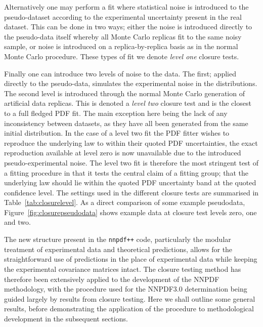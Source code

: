 Alternatively one may perform a fit where statistical noise is introduced to the pseudo-dataset according to the experimental uncertainty present in the real dataset. This can be done in two ways; either the noise is introduced directly to the pseudo-data itself whereby all Monte Carlo replicas fit to the same noisy sample, or noise is introduced on a replica-by-replica basis as in the normal Monte Carlo procedure. These types of fit we denote \emph{level one} closure tests.

Finally one can introduce two levels of noise to the data. The first; applied directly to the pseudo-data, simulates the experimental noise in the distributions. The second level is introduced through the normal Monte Carlo generation of artificial data replicas. This is denoted a \emph{level two} closure test and is the closest to a full fledged PDF fit. The main exception here being the lack of any inconsistency between datasets, as they have all been generated from the same initial distribution. In the case of a level two fit the PDF fitter wishes to reproduce the underlying law to within their quoted PDF uncertainties, the exact reproduction available at level zero is now unavailable due to the introduced pseudo-experimental noise. The level two fit is therefore the most stringent test of a fitting procedure in that it tests the central claim of a fitting group; that the underlying law should lie within the quoted PDF uncertainty band at the quoted confidence level. The settings used in the different closure tests are summarised in Table~\ref{tab:closurelevel}. As a direct comparison of some example pseudodata, Figure~\ref{fig:closurepseudodata} shows example data at closure test levels zero, one and two.

The new structure present in the {\tt nnpdf++} code, particularly the modular treatment of experimental data and theoretical predictions, allows for the straightforward use of predictions in the place of experimental data while keeping the experimental covariance matrices intact. The closure testing method has therefore been extensively applied to the development of the NNPDF methodology, with the procedure used for the NNPDF3.0 determination being guided largely by results from closure testing. Here we shall outline some general results, before demonstrating the application of the procedure to methodological development in the subsequent sections.

